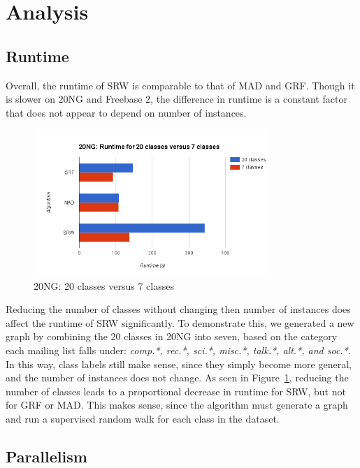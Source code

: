 \documentclass[12pt]{article}
\begin{document}
\pagebreak


\section{Analysis}

\subsection{Runtime}
Overall, the runtime of SRW is comparable to that of MAD and GRF.
Though it is slower on 20NG and Freebase 2, the difference in runtime is a constant factor that does not appear to depend on number of instances.

\begin{figure}[h]
    \centering
    \includegraphics[width=0.8\textwidth]{figures/20ng-classes}
    \caption{20NG: 20 classes versus 7 classes\label{fig:classes}}
\end{figure}
Reducing the number of classes without changing then number of instances does affect the runtime of SRW significantly.
To demonstrate this, we generated a new graph by combining the 20 classes in 20NG into seven, based on the category each mailing list falls under: \textit{comp.*, rec.*, sci.*, misc.*, talk.*, alt.*, \textnormal{and} soc.*}.
In this way, class labels still make sense, since they simply become more general, and the number of instances does not change.
As seen in Figure~\ref{fig:classes}, reducing the number of classes leads to a proportional decrease in runtime for SRW, but not for GRF or MAD.
This makes sense, since the algorithm must generate a graph and run a supervised random walk for each class in the dataset.

\subsection{Parallelism}
\end{document}
